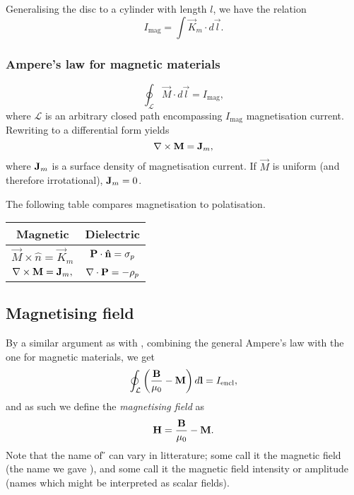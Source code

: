         Generalising the disc to a cylinder with length $l$, we have the relation
        \begin{equation}
            I_{\text{mag}} = \int \vec{K}_m\cdot d\vec{l}.
        \end{equation}

    \subsubsection{Ampere's law for magnetic materials}
        \begin{equation}
            \oint_\mathcal{L}\vec{M}\cdot d\vec{l} = I_{\text{mag}},
        \end{equation}
        where $\mathcal{L}$ is an arbitrary closed path encompassing $I_{\text{mag}}$ magnetisation current. 
        Rewriting to a differential form yields
        \begin{equation}
            \nabla \times \mathbf{M} = \mathbf{J}_m,
        \end{equation}
        where $\mathbf{J}_m$ is a surface density of magnetisation current. 
        If $\vec{M}$ is uniform (and therefore irrotational), $\mathbf{J}_m = 0$.

        The following table compares magnetisation to polatisation.
        \begin{center}
            \begin{tabular}{ c|c } 
            Magnetic & Dielectric \\
            \hline
                $\vec{M}\times\hat{n} = \vec{K}_m$ & $\p \cdot \hat{n} = \sigma_p$ \\
                $\nabla \times \mathbf{M} = \mathbf{J}_m,$ & $\nabla \cdot \mathbf{P} = -\rho_p$
            \end{tabular}
        \end{center}

\subsection{Magnetising field}
    By a similar argument as with \D, combining the general Ampere's law with the one for magnetic materials, we get
    \begin{equation*}
        \oint_\mathcal{L}\left(\frac{\mathbf{B}}{\mu_0}-\mathbf{M}\right)d\mathbf{l} = I_{\text{encl}},
    \end{equation*}
    and as such we define the \textit{magnetising field} as 
    \begin{equation}
        \mathbf{H} = \frac{\mathbf{B}}{\mu_0}-\mathbf{M}.
    \end{equation}
    Note that the name of \H{} can vary in litterature; some call it the magnetic field 
    (the name we gave \B), and some call it the magnetic field intensity or amplitude 
    (names which might be interpreted as scalar fields).

